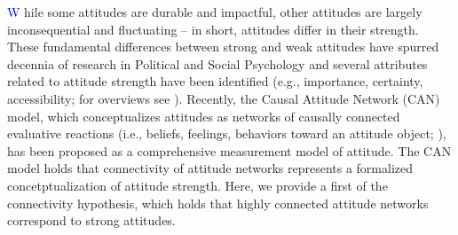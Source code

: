 \documentclass[10pt]{article}
\begin{document}
\begin{multicols}{2}


\lettrine[findent=0pt, lines=3]{\textcolor{blue}W}{ }hile some  attitudes are durable and impactful, other  attitudes are largely inconsequential and fluctuating -- in short, attitudes differ in their strength. These fundamental differences between strong and weak attitudes have spurred decennia of research in Political and Social Psychology and several attributes related to attitude strength have been identified (e.g., importance, certainty, accessibility; for overviews see ). Recently, the Causal Attitude Network (CAN) model,  which conceptualizes attitudes as networks of causally connected evaluative reactions (i.e., beliefs, feelings, behaviors toward an attitude object; ), has been proposed as a comprehensive measurement model of attitude. The CAN model holds that connectivity of attitude networks represents a formalized concetptualization of attitude strength. Here, we provide a first of the connectivity hypothesis, which holds that highly connected attitude networks correspond to strong attitudes.

\end{multicols}
\end{document}
